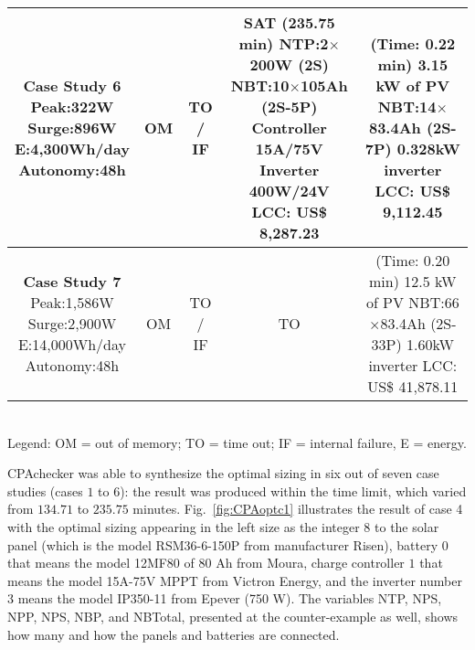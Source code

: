 \begin{table}
\begin{scriptsize}
\begin{tabular}{|c|c|c|c|c|}
\makecell{\textbf{Case Study 6}\\Peak:322W\\Surge:896W\\E:4,300Wh/day\\Autonomy:48h} & OM & TO / IF & \makecell {SAT (235.75 min) \\NTP:2$\times$200W (2S)\\NBT:10$\times$105Ah (2S-5P)\\Controller 15A/75V\\Inverter 400W/24V \\LCC: US\$ 8,287.23} & \makecell{(Time: 0.22 min)\\3.15 kW of PV\\NBT:14$\times$83.4Ah (2S-7P)\\0.328kW inverter\\LCC: US\$ 9,112.45} \\
\hline
\makecell{\textbf{Case Study 7}\\Peak:1,586W\\Surge:2,900W\\E:14,000Wh/day\\Autonomy:48h} & OM & TO / IF & TO & \makecell{(Time: 0.20 min)\\12.5 kW of PV\\NBT:66$\times$83.4Ah (2S-33P)\\1.60kW inverter\\LCC: US\$ 41,878.11} \\
\hline
\hline
\end{tabular}
\\Legend: OM = out of memory; TO = time out; IF = internal failure, E = energy.
\end{scriptsize}
\end{table}

CPAchecker was able to synthesize the optimal sizing in six 
out of seven case studies (cases $1$ to $6$): the result was produced within 
the time limit, which varied from $134.71$ to $235.75$ minutes. Fig.~\ref{fig:CPAoptc1} illustrates the result of case 4 with the optimal sizing appearing in the left size as the integer $8$ to the solar panel (which is the model RSM36-6-150P from manufacturer Risen), battery $0$ that means the model 12MF80 of 80 Ah from Moura, charge controller $1$ that means the model 15A-75V MPPT from Victron  Energy, and the inverter number $3$ means the model IP350-11 from Epever (750 W). The variables NTP, NPS, NPP, NPS, NBP, and NBTotal, presented at the counter-example as well, shows how many and how the panels and batteries are connected.

